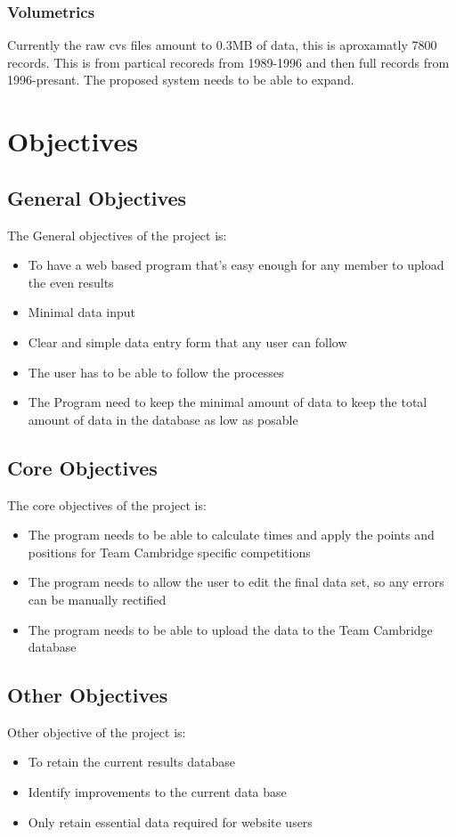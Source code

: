 \subsubsection{Volumetrics}
Currently the raw cvs files amount to 0.3MB of data, this is aproxamatly 7800 records. This is from partical recoreds from 1989-1996 and then full records from 1996-presant. The proposed system needs to be able to expand.
\section{Objectives}

\subsection{General Objectives}
The General objectives of the project is:
\begin{itemize}
	\item To have a web based program that's easy enough for any member to upload the even results
	\item Minimal data input
	\item Clear and simple data entry form that any user can follow
	\item The user has to be able to follow the processes
	\item The Program need to keep the minimal amount of data to keep the total amount of data in the database as low as posable
\end{itemize}

\subsection{Core Objectives}
The core objectives of the project is:
\begin{itemize}
	\item The program needs to be able to calculate times and apply the points and positions for Team Cambridge specific competitions
	\item The program needs to allow the user to edit the final data set, so any errors can be manually rectified
	\item The program needs to be able to upload the data to the Team Cambridge database
\end{itemize}
\subsection{Other Objectives}
Other objective of the project is:
\begin{itemize}
	\item To retain the current results database
	\item Identify improvements to the current data base
	\item Only retain essential data required for website users 
\end{itemize}
